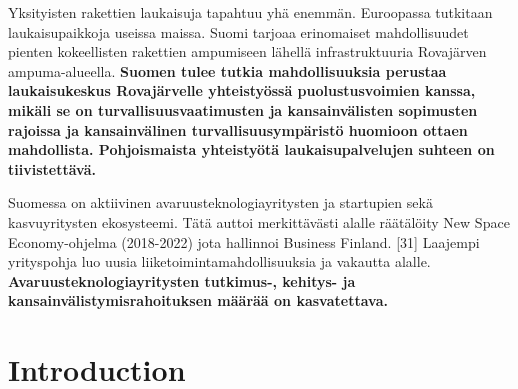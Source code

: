 \documentclass[nobib,finnish,oneside,openany,notoc,a4paper]{tufte-book}
\begin{document}
Yksityisten rakettien laukaisuja tapahtuu yhä enemmän. Euroopassa
tutkitaan laukaisupaikkoja useissa maissa. Suomi tarjoaa erinomaiset
mahdollisuudet pienten kokeellisten rakettien ampumiseen lähellä
infrastruktuuria Rovajärven ampuma-alueella. \textbf{Suomen tulee tutkia
mahdollisuuksia perustaa laukaisukeskus Rovajärvelle yhteistyössä
puolustusvoimien kanssa, mikäli se on turvallisuusvaatimusten ja
kansainvälisten sopimusten rajoissa ja kansainvälinen
turvallisuusympäristö huomioon ottaen mahdollista. Pohjoismaista
yhteistyötä laukaisupalvelujen suhteen on tiivistettävä.}

Suomessa on aktiivinen avaruusteknologiayritysten ja startupien sekä
kasvuyritysten ekosysteemi. Tätä auttoi merkittävästi alalle räätälöity
New Space Economy-ohjelma (2018-2022) jota hallinnoi Business Finland.
{[}31{]} Laajempi yrityspohja luo uusia liiketoimintamahdollisuuksia ja
vakautta alalle. \textbf{Avaruusteknologiayritysten tutkimus-, kehitys-
ja kansainvälistymisrahoituksen määrää on kasvatettava.}

\chapter{Introduction}
\end{document}
